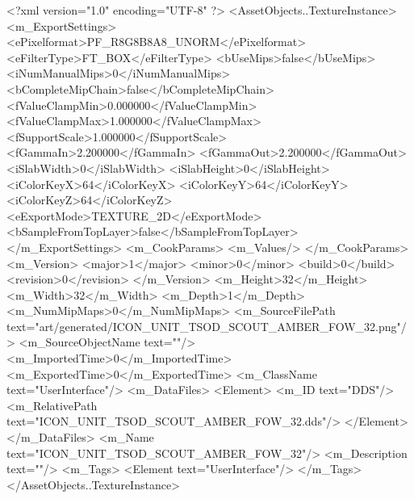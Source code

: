 <?xml version="1.0" encoding="UTF-8" ?>
<AssetObjects..TextureInstance>
	<m_ExportSettings>
		<ePixelformat>PF_R8G8B8A8_UNORM</ePixelformat>
		<eFilterType>FT_BOX</eFilterType>
		<bUseMips>false</bUseMips>
		<iNumManualMips>0</iNumManualMips>
		<bCompleteMipChain>false</bCompleteMipChain>
		<fValueClampMin>0.000000</fValueClampMin>
		<fValueClampMax>1.000000</fValueClampMax>
		<fSupportScale>1.000000</fSupportScale>
		<fGammaIn>2.200000</fGammaIn>
		<fGammaOut>2.200000</fGammaOut>
		<iSlabWidth>0</iSlabWidth>
		<iSlabHeight>0</iSlabHeight>
		<iColorKeyX>64</iColorKeyX>
		<iColorKeyY>64</iColorKeyY>
		<iColorKeyZ>64</iColorKeyZ>
		<eExportMode>TEXTURE_2D</eExportMode>
		<bSampleFromTopLayer>false</bSampleFromTopLayer>
	</m_ExportSettings>
	<m_CookParams>
		<m_Values/>
	</m_CookParams>
	<m_Version>
		<major>1</major>
		<minor>0</minor>
		<build>0</build>
		<revision>0</revision>
	</m_Version>
	<m_Height>32</m_Height>
	<m_Width>32</m_Width>
	<m_Depth>1</m_Depth>
	<m_NumMipMaps>0</m_NumMipMaps>
	<m_SourceFilePath text="art/generated/ICON_UNIT_TSOD_SCOUT_AMBER_FOW_32.png"/>
	<m_SourceObjectName text=""/>
	<m_ImportedTime>0</m_ImportedTime>
	<m_ExportedTime>0</m_ExportedTime>
	<m_ClassName text="UserInterface"/>
	<m_DataFiles>
		<Element>
			<m_ID text="DDS"/>
			<m_RelativePath text="ICON_UNIT_TSOD_SCOUT_AMBER_FOW_32.dds"/>
		</Element>
	</m_DataFiles>
	<m_Name text="ICON_UNIT_TSOD_SCOUT_AMBER_FOW_32"/>
	<m_Description text=""/>
	<m_Tags>
		<Element text="UserInterface"/>
	</m_Tags>
</AssetObjects..TextureInstance>
